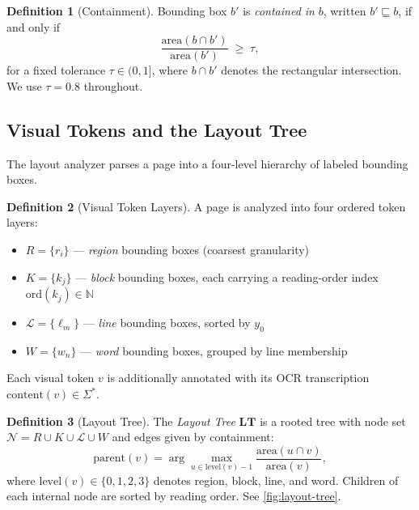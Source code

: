 \documentclass{article}
\theoremstyle{definition}
\newtheorem{definition}{Definition}[section]
\newcommand{\LT}{\mathbf{LT}}
\newcommand{\Nodes}{\mathcal{N}}
\begin{document}
\begin{definition}[Containment]
      Bounding box $b'$ is \emph{contained in} $b$, written $b' \sqsubseteq b$,
      if and only if
      \[
            \frac{\mathrm{area}(b \cap b')}{\mathrm{area}(b')} \;\ge\; \tau,
      \]
      for a fixed tolerance $\tau \in (0, 1]$, where $b \cap b'$ denotes the
      rectangular intersection.  We use $\tau = 0.8$ throughout.
\end{definition}

\subsection{Visual Tokens and the Layout Tree}

The layout analyzer \cite{PPDocLayout, PaddleOCR30} parses a page into a
four-level hierarchy of labeled bounding boxes.

\begin{definition}[Visual Token Layers]
      A page is analyzed into four ordered token layers:
      \begin{itemize}
            \item $R = \{r_i\}$ --- \emph{region} bounding boxes (coarsest granularity)
            \item $K = \{k_j\}$ --- \emph{block} bounding boxes, each carrying a
                  reading-order index $\mathrm{ord}(k_j) \in \mathbb{N}$
                  \cite{zhang2024modeling}
            \item $\mathcal{L} = \{\ell_m\}$ --- \emph{line} bounding boxes, sorted by $y_0$
            \item $W = \{w_n\}$ --- \emph{word} bounding boxes, grouped by line membership
      \end{itemize}
      Each visual token $v$ is additionally annotated with its OCR transcription
      $\mathrm{content}(v) \in \Sigma^{*}$.
\end{definition}

\begin{definition}[Layout Tree]
      \label{def:lt}
      The \emph{Layout Tree} $\LT$ is a rooted tree with node set
      $\Nodes = R \cup K \cup \mathcal{L} \cup W$ and edges given by containment:
      \[
            \mathrm{parent}(v) = \arg\max_{u \in \mathrm{level}(v)-1}
            \frac{\mathrm{area}(u \cap v)}{\mathrm{area}(v)},
      \]
      where $\mathrm{level}(v) \in \{0,1,2,3\}$ denotes region, block, line, and
      word.  Children of each internal node are sorted by reading order.
      See \cref{fig:layout-tree}.
\end{definition}
\end{document}
